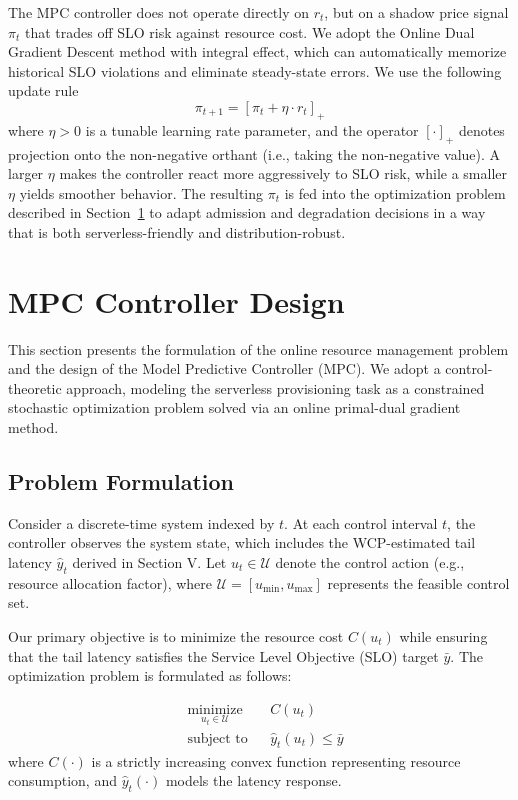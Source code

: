 \documentclass[journal]{IEEEtran}
\begin{document}
The MPC controller does not operate directly on $r_t$, but on a
shadow price signal $\pi_t$ that trades off SLO risk against resource
cost. We adopt the Online Dual Gradient Descent method with integral effect, which can automatically memorize historical SLO violations and eliminate steady-state errors. We use the following update rule
\begin{equation}
  \pi_{t+1} = \left[ \pi_t + \eta \cdot r_t \right]_+
  \label{eq:shadow-price}
\end{equation}
where $\eta > 0$ is a tunable learning rate parameter, and the operator $[\cdot]_+$ denotes projection onto the non-negative orthant (i.e., taking the non-negative value). A larger $\eta$ makes the controller react more aggressively to SLO risk, while a smaller $\eta$ yields smoother behavior. The resulting
$\pi_t$ is fed into the optimization problem described in
Section~\ref{sec:mpc-controller} to adapt admission and degradation
decisions in a way that is both serverless-friendly and
distribution-robust.

\section{MPC Controller Design} 
\label{sec:mpc-controller} 

This section presents the formulation of the online resource management problem and the design of the Model Predictive Controller (MPC). We adopt a control-theoretic approach, modeling the serverless provisioning task as a constrained stochastic optimization problem solved via an online primal-dual gradient method. 

\subsection{Problem Formulation} 
Consider a discrete-time system indexed by $t$. At each control interval $t$, the controller observes the system state, which includes the WCP-estimated tail latency $\hat{y}_t$ derived in Section V. Let $u_t \in \mathcal{U}$ denote the control action (e.g., resource allocation factor), where $\mathcal{U} = [u_{\min}, u_{\max}]$ represents the feasible control set. 

Our primary objective is to minimize the resource cost $C(u_t)$ while ensuring that the tail latency satisfies the Service Level Objective (SLO) target $\bar{y}$. The optimization problem is formulated as follows: 

\begin{equation} 
\label{eq:primal} 
\begin{aligned} 
& \underset{u_t \in \mathcal{U}}{\text{minimize}} 
& & C(u_t) \\ 
& \text{subject to} 
& & \hat{y}_t(u_t) \leq \bar{y} 
\end{aligned} 
\end{equation} 
where $C(\cdot)$ is a strictly increasing convex function representing resource consumption, and $\hat{y}_t(\cdot)$ models the latency response. 
\end{document}
